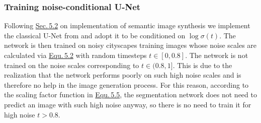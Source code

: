 \subsubsection{Training noise-conditional U-Net}
Following \hyperref[sec:5.2]{Sec.\,5.2} on implementation of semantic image synthesis we implement the classical U-Net from \cite{unet} and adopt it to be conditioned on $\log\sigma(t)$. The network is then trained on noisy cityscapes training images whose noise scales are calculated via \hyperref[equ:5.2]{Equ.\,5.2} with random timesteps $t\in[0,0.8]$. The network is not trained on the noise scales corresponding to $t\in(0.8,1]$. This is due to the realization that the network performs poorly on such high noise scales and is therefore no help in the image generation process. For this reason, according to the scaling factor function in \hyperref[equ:5.5]{Equ.\,5.5}, the segmentation network does not need to predict an image with such high noise anyway, so there is no need to train it for high noise $t>0.8$.

